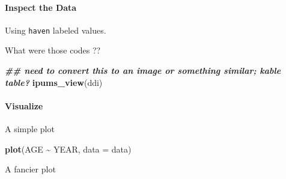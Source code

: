 \documentclass[
]{book}
\newenvironment{Shaded}{\begin{snugshade}}{\end{snugshade}}
\newcommand{\AttributeTok}[1]{\textcolor[rgb]{0.13,0.29,0.53}{#1}}
\newcommand{\DecValTok}[1]{\textcolor[rgb]{0.00,0.00,0.81}{#1}}
\newcommand{\DocumentationTok}[1]{\textcolor[rgb]{0.56,0.35,0.01}{\textbf{\textit{#1}}}}
\newcommand{\FunctionTok}[1]{\textcolor[rgb]{0.13,0.29,0.53}{\textbf{#1}}}
\newcommand{\NormalTok}[1]{#1}
\newcommand{\SpecialCharTok}[1]{\textcolor[rgb]{0.81,0.36,0.00}{\textbf{#1}}}
\begin{document}
\hypertarget{inspect-the-data}{%
\paragraph*{Inspect the Data}\label{inspect-the-data}}

Using \texttt{haven} labeled values.

\begin{Shaded}
\end{Shaded}

What were those codes ??

\begin{Shaded}
\begin{Highlighting}[]
\DocumentationTok{\#\# need to convert this to an image or something similar; kable table?}
\FunctionTok{ipums\_view}\NormalTok{(ddi)}
\end{Highlighting}
\end{Shaded}

\hypertarget{visualize}{%
\paragraph*{Visualize}\label{visualize}}

A simple plot

\begin{Shaded}
\begin{Highlighting}[]
\FunctionTok{plot}\NormalTok{(AGE }\SpecialCharTok{\textasciitilde{}}\NormalTok{ YEAR, }\AttributeTok{data =}\NormalTok{ data)}
\end{Highlighting}
\end{Shaded}

A fancier plot
\end{document}

